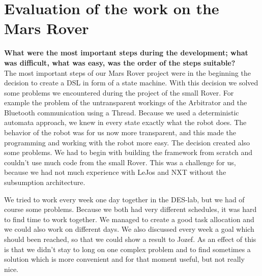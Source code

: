 \documentclass[11pt,a4paper]{article}
\begin{document}

\section{Evaluation of the work on the Mars Rover}
\textbf{What were the most important steps during the development; what was difficult, what was easy, was the order of the steps suitable?}\\
The most important steps of our Mars Rover project were in the beginning the decision to create a DSL in form of a state machine. With this decision we solved some problems we encountered during the project of the small Rover. For example the problem of the untransparent workings of the Arbitrator and the Bluetooth communication using a Thread. Because we used a deterministic automata approach, we knew in every state exactly what the robot does. The behavior of the robot was for us now more transparent, and this made the programming and working with the robot more easy. 
The decision created also some problems. We had to begin with building the framework from scratch and couldn't use much code from the small Rover. This was a challenge for us, because we had not much experience with LeJos and NXT without the subsumption architecture.

We tried to work every week one day together in the DES-lab, but we had of course some problems. Because we both had very different schedules, it was hard to find time to work together. We managed to create a good task allocation and we could also work on different days. We also discussed every week a goal which should been reached, so that we could show a result to Jozef. As an effect of this is that we didn't stay to long on one complex problem and to find sometimes a solution which is more convenient and for that moment useful, but not really nice. %
\end{document}
